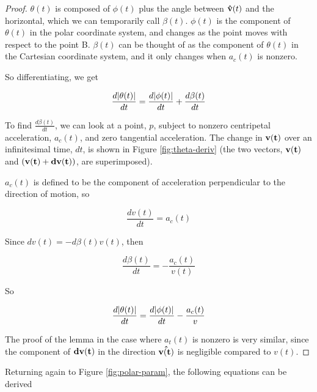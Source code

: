 \begin{proof}

$\theta(t)$ is composed of $\phi(t)$ plus the angle between $\mathbf{\hat{v}}(t)$ and the horizontal, which we can temporarily call $\beta(t)$. $\phi(t)$ is the component of $\theta(t)$ in the polar coordinate system, and changes as the point moves with respect to the point B. $\beta(t)$ can be thought of as the component of $\theta(t)$ in the Cartesian coordinate system, and it only changes when $a_c(t)$ is nonzero. 

So differentiating, we get

\[
\frac{d\abs{\theta(t)}}{dt} = \frac{d\abs{\phi(t)}}{dt} + \frac{d\beta(t)}{dt}
\]

To find $\frac{d\beta(t)}{dt}$, we can look at a point, $p$, subject to nonzero centripetal acceleration, $a_c(t)$, and zero tangential acceleration. The change in $\mathbf{v(t)}$ over an infinitesimal time, $dt$, is shown in Figure \ref{fig:theta-deriv} (the two vectors, $\mathbf{v(t)}$ and $\paren{\bvec{v(t)}+\bvec{dv(t)}}$, are superimposed). 


$a_c(t)$ is defined to be the component of acceleration perpendicular to the direction of motion, so

\[
\frac{dv(t)}{dt} = a_c(t)
\]

Since $dv(t) = -d\beta(t) v(t)$, then

\[
\frac{d\beta(t)}{dt} = -\frac{a_c(t)}{v(t)}
\]

So

\[
\frac{d\abs{\theta(t)}}{dt} = \frac{d\abs{\phi(t)}}{dt} - \frac{a_c(t)}{v}
\]

The proof of the lemma in the case where $a_t(t)$ is nonzero is very similar, since the component of $\mathbf{dv(t)}$ in the direction $\mathbf{\hat{v(t)}}$ is negligible compared to $v(t)$.

\end{proof}

Returning again to Figure \ref{fig:polar-param}, the following equations can be derived

